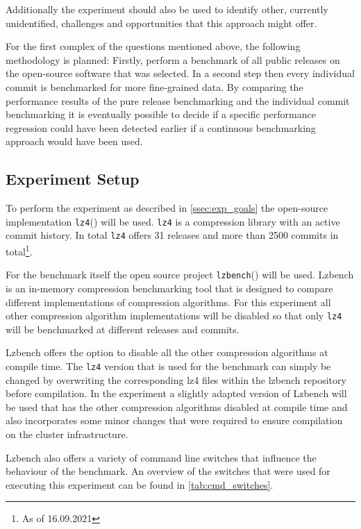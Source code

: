 \documentclass[	runningheads,
				a4paper]{llncs}
\begin{document}
	Additionally the experiment should also be used to identify other, currently unidentified, challenges and opportunities that this approach might offer.

	For the first complex of the questions mentioned above, the following methodology is planned: Firstly, perform a benchmark of all public releases on the open-source software that was selected. In a second step then every individual commit is benchmarked for more fine-grained data. By comparing the performance results of the pure release benchmarking and the individual commit benchmarking it is eventually possible to decide if a specific performance regression could have been detected earlier if a continuous benchmarking approach would have been used.

	\subsection{Experiment Setup}
	\label{ssec:exp_setup}
	
	To perform the experiment as described in \autoref{ssec:exp_goals} the open-source implementation \texttt{lz4}(\cite{gitlz4}) will be used. \texttt{lz4} is a compression library with an active commit history. In total \texttt{lz4} offers 31 releases and more than 2500 commits in total\footnote{As of 16.09.2021}. 
	
	For the benchmark itself the open source project \texttt{lzbench}(\cite{gitlzbench}) will be used. Lzbench is an in-memory compression benchmarking tool that is designed to compare different implementations of compression algorithms. For this experiment all other compression algorithm implementations will be disabled so that only \texttt{lz4} will be benchmarked at different releases and commits. 
	
	Lzbench offers the option to disable all the other compression algorithms at compile time. The \texttt{lz4} version that is used for the benchmark can simply be changed by overwriting the corresponding lz4 files within the lzbench repository before compilation. In the experiment a slightly adapted version of Lzbench will be used that has the other compression algorithms disabled at compile time and also incorporates some minor changes that were required to ensure compilation on the cluster infrastructure.

	Lzbench also offers a variety of command line switches that influence the behaviour of the benchmark. An overview of the switches that were used for executing this experiment can be found in \autoref{tab:cmd_switches}.
\end{document}
